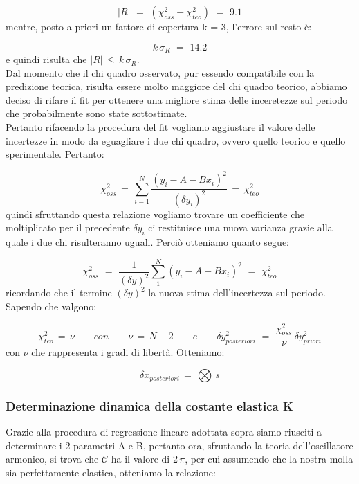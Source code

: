 \begin{equation*}
	|R| \,\,=\,\, (\chi_{oss}^2 - \chi_{teo}^2) \,\,=\,\, 9.1
\end{equation*}
%
mentre, posto a priori un fattore di copertura k = 3, l'errore sul resto è:

\begin{equation*}
	k \, \sigma_{R} \,\,=\,\, 14.2
\end{equation*}
%
e quindi risulta che $|R| \, \leq \, k \, \sigma_{R}$.\\

Dal momento che il chi quadro osservato, pur essendo compatibile con la predizione teorica, risulta essere molto maggiore del chi quadro teorico, abbiamo deciso di rifare il fit per ottenere una migliore stima delle inceretezze sul periodo che probabilmente sono state sottostimate.\\
Pertanto rifacendo la procedura del fit vogliamo aggiustare il valore delle incertezze in modo da eguagliare i due chi quadro, ovvero quello teorico e quello sperimentale. Pertanto:

\begin{equation*}
	\chi_{oss}^2 \,=\, \sum_{i=1}^{N} \frac{(y_i - A - Bx_i)^2}{(\delta y_i)^2} \,=\, \chi_{teo}^2 
\end{equation*}
%
quindi sfruttando questa relazione vogliamo trovare un coefficiente che moltiplicato per il precedente $\delta y_i$ ci restituisce una nuova varianza grazie alla quale i due chi risulteranno uguali. Perciò otteniamo quanto segue:
	
\begin{equation*}
	\chi_{oss}^2 \,\,=\,\, \frac{1}{(\delta y)^2} \sum_{1}^{N} (y_i - A - Bx_i)^2  \,\,=\,\, \chi_{teo}^2
\end{equation*}
%
ricordando che il termine $(\delta y)^2$ la nuova stima dell'incertezza sul periodo. Sapendo che valgono:
	
\begin{equation*}
	\chi_{teo}^2 \,=\, \nu \quad \quad con \quad \quad
	\nu \,=\, N - 2 \quad \quad e \quad \quad
	\delta y_{posteriori}^2 \,\,=\,\, \frac{\chi_{oss}^2}{\nu} \, \delta y_{priori}^2
\end{equation*}
%
con $\nu$ che rappresenta i gradi di libertà. Otteniamo:

\begin{equation*}
	\delta x_{posteriori} \,=\, \bigotimes \,s
\end{equation*}	 

\subsubsection{Determinazione dinamica della costante elastica K}
Grazie alla procedura di regressione lineare adottata sopra siamo riusciti a determinare i 2 parametri A e B, pertanto ora, sfruttando la teoria dell'oscillatore armonico, si trova che $\mathcal{C}$ ha il valore di $2 \, \pi$, per cui assumendo che la nostra molla sia perfettamente elastica, otteniamo la relazione:

